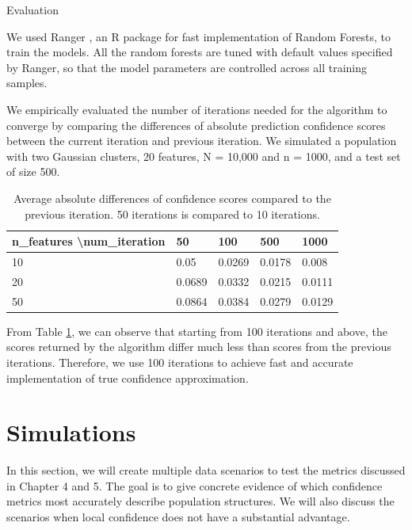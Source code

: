 \documentclass[12pt]{pom_thesis}
\begin{document}
\begin{chapter}{Evaluation}
\begin{algorithm}
\begin{algorithmc}
\EndProcedure
\newline
\end{algorithmc}
\end{algorithm}

\vspace{2mm}
We used Ranger \citep{ranger}, an R package for fast implementation of Random Forests, to train the models. All the random forests are tuned with default values specified by Ranger, so that the model parameters are controlled across all training samples. 

We empirically evaluated the number of iterations needed for the algorithm to converge by comparing the differences of absolute prediction confidence scores between the current iteration and previous iteration. We simulated a population with two Gaussian clusters, 20 features, N = 10,000 and n = 1000, and a test set of size 500. 

\begin{table}[h]
\centering
\label{convergencetable}
\begin{tabular}{|l|l|l|l|l|}
\hline
n\_features \textbackslash{}num\_iteration & 50     & 100    & 500    & 1000   \\
\hline
10                                         & 0.05   & 0.0269 & 0.0178 & 0.008  \\
20                                         & 0.0689 & 0.0332 & 0.0215 & 0.0111 \\
50                                         & 0.0864 & 0.0384 & 0.0279 & 0.0129\\
\hline

\end{tabular}

\caption{Average absolute differences of confidence scores compared to the previous iteration. 50 iterations is compared to 10 iterations.}
\end{table}

From Table \ref{convergencetable}, we can observe that starting from 100 iterations and above, the scores returned by the algorithm differ much less than scores from the previous iterations. Therefore, we use 100 iterations to achieve fast and accurate implementation of true confidence approximation. 

\section{Simulations}
In this section, we will create multiple data scenarios to test the metrics discussed in Chapter 4 and 5. The goal is to give concrete evidence of which confidence metrics most accurately describe population structures. We will also discuss the scenarios when local confidence does not have a substantial advantage. 


\end{chapter}
\end{document}
